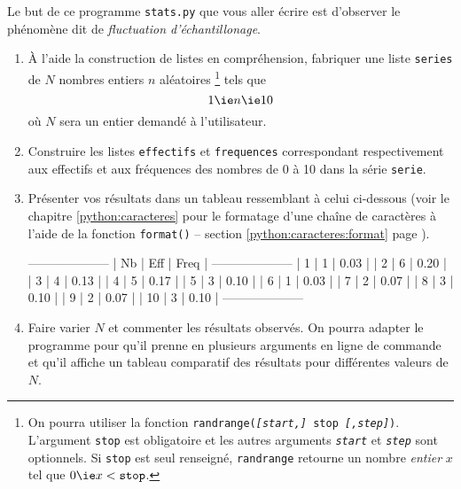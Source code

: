 \begin{exercice}
Le but de ce programme \texttt{stats.py} que vous aller écrire est d'observer le phénomène dit de \textit{fluctuation d'échantillonage}.
\begin{enumerate}
\item À l'aide la construction de listes en compréhension, fabriquer une liste \texttt{series} de $N$ nombres entiers $n$ aléatoires
\footnote{On pourra utiliser la fonction \texttt{randrange(\textit{[start,]} stop \textit{[,step]})}. L'argument \texttt{stop} est obligatoire et les autres arguments \texttt{\textit{start}} et \texttt{\textit{step}} sont optionnels. Si \texttt{stop} est seul renseigné, \texttt{randrange} retourne un nombre \textit{entier} $x$ tel que $0\ie x < \texttt{stop}$.} tels que \[1\ie n \ie 10\] où $N$ sera un entier demandé à l'utilisateur.
\item Construire les listes \texttt{effectifs} et \texttt{frequences} correspondant respectivement aux effectifs et aux fréquences des nombres de 0 à 10 dans la série \texttt{serie}.
\item Présenter vos résultats dans un tableau ressemblant à celui ci-dessous (voir le chapitre \ref{python:caracteres} pour le formatage d'une chaîne de caractères à l'aide de la fonction \texttt{format()}
-- section \ref{python:caracteres:format} page \pageref{python:caracteres:format}).
\begin{pythoncode}
--------------------
| Nb | Eff  | Freq |
--------------------
| 1  | 1    | 0.03 |
| 2  | 6    | 0.20 |
| 3  | 4    | 0.13 |
| 4  | 5    | 0.17 |
| 5  | 3    | 0.10 |
| 6  | 1    | 0.03 |
| 7  | 2    | 0.07 |
| 8  | 3    | 0.10 |
| 9  | 2    | 0.07 |
| 10 | 3    | 0.10 |
--------------------
\end{pythoncode}
\item Faire varier $N$ et commenter les résultats observés. On pourra adapter le programme pour qu'il prenne en plusieurs arguments en ligne de commande et qu'il affiche un tableau comparatif des résultats pour différentes valeurs de $N$.

\end{enumerate}
\end{exercice}